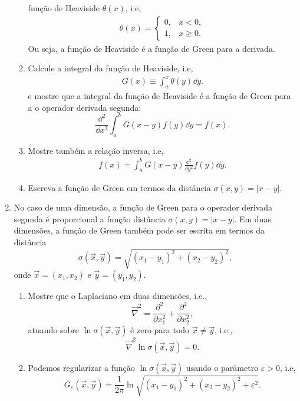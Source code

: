 \begin{enumerate}
\begin{enumerate}
		            função de Heaviside $\theta(x)$, i.e,
		            \begin{align}
			            \theta(x) = \begin{cases}
				                        0, & x<0,     \\
				                        1, & x\geq 0.
			                        \end{cases}
		            \end{align}
		            Ou seja, a função de Heaviside é a função de Green para a derivada.
		      \item Calcule a integral da função de Heaviside, i.e,
		            \begin{align}
			            G(x) \equiv \int_{a}^{x}\theta(y)\dd y.
		            \end{align}
		            e mostre que a integral da função de Heaviside é a função de Green
		            para a o operador derivada segunda:
		            $$\frac{\dd^2}{\dd x^2}\int_{a}^{b}G(x-y)f(y)\dd y = f(x).$$
		      \item Mostre também a relação inversa, i.e,
		            \begin{align}
			            f(x) = \int_{a}^{b}G(x-y)\frac{\dd^2}{\dd y^2}f(y)\dd y.
		            \end{align}
		      \item Escreva a função de Green em termos da distância $\sigma(x,y) = |x-y|$.
	      \end{enumerate}
	\item No caso de uma dimensão, a função de Green para o operador derivada
	      segunda é proporcional a função distância $\sigma(x,y) = |x-y|$. Em duas
	      dimensões, a função de Green também pode ser escrita em termos da
	      distância $$\sigma(\vec{x},\vec{y}) = \sqrt{(x_1-y_1)^2+(x_2-y_2)^2},$$
	      onde $\vec{x}=(x_1,x_2)$ e $\vec{y}=(y_1,y_2)$.
	      \begin{enumerate}
		      \item Mostre que o Laplaciano em duas dimensões, i.e.,
		            $$\vec\nabla^2 = \frac{\partial^2}{\partial x_1^2}+\frac{\partial^2}{\partial x_2^2},$$
		            atuando sobre $\ln\sigma(\vec{x},\vec{y})$ é zero para todo $\vec{x}\neq\vec{y}$, i.e.,
		            $$\vec\nabla^2\ln\sigma(\vec{x},\vec{y}) = 0.$$
		      \item Podemos regularizar a função $\ln\sigma(\vec{x},\vec{y})$ usando
		            o parâmetro $\varepsilon>0$, i.e,
		            $$G_\varepsilon(\vec{x},\vec{y}) = \frac{1}{2\pi}\ln\sqrt{(x_1-y_1)^2+(x_2-y_2)^2+\varepsilon^2}.$$

\end{enumerate}
\end{enumerate}
